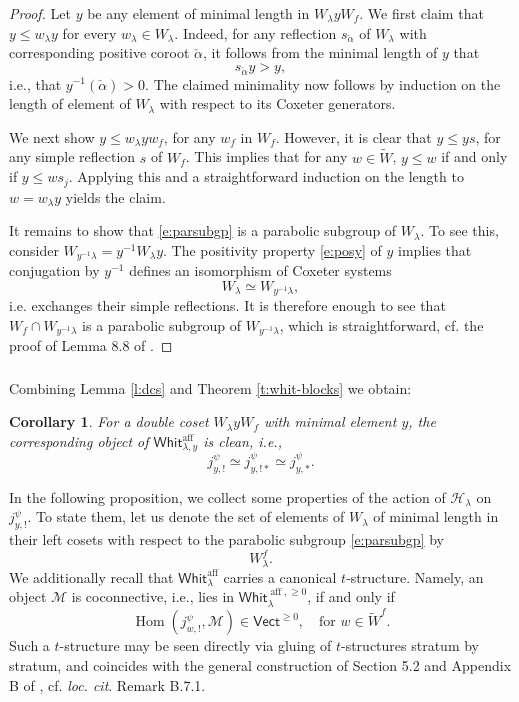 \documentclass[11pt,reqno]{amsart}
\newcommand{\sH}{\mathscr{H}}
\newcommand{\aff}{\operatorname{aff}}
\newcommand{\Hom}{\operatorname{Hom}}
\newtheorem{cor}[subsubsection]{Corollary}
\theoremstyle{remark}
\numberwithin{equation}{section}
\newcommand{\Vect}{\mathsf{Vect}}
\newcommand{\Whit}{\mathsf{Whit}}
\begin{document}
\begin{proof} Let $y$ be any element of minimal length in $W_\lambda y 
	W_{f}$. We first claim that $y \leqslant w_\lambda y$ for every 
	$w_\lambda 
	\in W_\lambda$. Indeed, for any reflection $s_{\check{\alpha}}$ of 
	$W_\lambda$ 
	with 
	corresponding positive coroot $\check{\alpha}$, it follows from the minimal 
	length of $y$ that  \begin{equation}\label{e:posy}s_{\check{\alpha}} y > 
	y,\end{equation}i.e., that 
	$y^{-1}(\check{\alpha}) > 0$. 
	The claimed minimality now follows by induction on the length of element of 
	$W_\lambda$ with respect to its Coxeter generators. 
	
	We next show $y \leqslant w_\lambda y w_f$, for any $w_f$ in $W_f$. 
	However, it is clear that $y \leqslant ys$, for any simple reflection $s$ 
	of $W_f$. This 
	implies that for any $w \in \widetilde{W}$, $y \leqslant w$ if and only if 
	$y 
	\leqslant ws_j$. Applying this and a straightforward induction on the 
	length 
	to $w = w_\lambda y$ yields the claim. 
	
	It remains to show that \eqref{e:parsubgp} is a parabolic 
	subgroup 
	of $W_\lambda$. To see this, consider $W_{y^{-1} \lambda} = y^{-1} 
	W_\lambda 
	y$. The positivity property \eqref{e:posy} of $y$ implies that conjugation 
	by $y^{-1}$ defines an 
	isomorphism of Coxeter systems \[W_\lambda \simeq W_{y^{-1} \lambda},\] 
	i.e. 
	exchanges their simple reflections. It is therefore enough to see that $W_f 
	\cap W_{y^{-1} \lambda}$ is a parabolic 
	subgroup of $W_{y^{-1} 
		\lambda}$, which is straightforward, cf. the 
	proof of Lemma 8.8 of \cite{lpw}. 
	\end{proof}

\subsubsection{}Combining Lemma \ref{l:dcs} and Theorem \ref{t:whit-blocks} we 
obtain:

\begin{cor} \label{c:minel}For a double coset $W_\lambda y W_f$ with minimal 
element $y$, the 
corresponding object of $\Whit_{\lambda, y}^{\aff}$ is clean, i.e., %
	\[
	 j_{y, !}^\psi \simeq j_{y, !*}^\psi \simeq j_{y, *}^\psi.
	\]
\end{cor} 


In the following proposition, we collect some properties of the action of 
$\sH_\lambda$ on $j_{y, !}^\psi$. To state them, let us denote 
the set of elements of $W_\lambda$ of minimal length in their left cosets with 
respect to the parabolic subgroup \eqref{e:parsubgp} by 
%
\[ W_\lambda^f.
\]
%
We additionally recall that $\Whit_{\lambda}^{\aff}$ carries a canonical 
$t$-structure. Namely, an 
object $\mathscr{M}$ is coconnective, i.e., lies in 
$\Whit_{\lambda}^{\aff, \geqslant 0}$, if and only if 
%
\[ \Hom( j_{w, !}^\psi, \mathscr{M}) \in \Vect^{\geqslant 0}, \quad \text{for } 
w \in \widetilde{W}^f.
\]  
%
Such a $t$-structure may be seen directly via gluing of $t$-structures stratum 
by stratum, and coincides with the general construction of Section 5.2 and 
Appendix B of \cite{whit}, cf. \emph{loc. cit}. Remark B.7.1.
\end{document}
